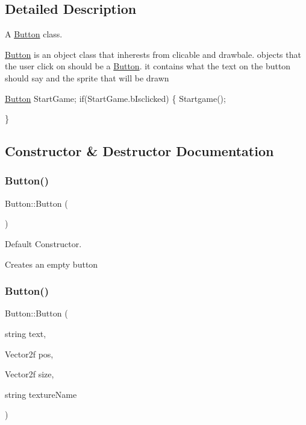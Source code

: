 \subsection{Detailed Description}
A \hyperlink{class_button}{Button} class.

\hyperlink{class_button}{Button} is an object class that inherests from clicable and drawbale. objects that the user click on should be a \hyperlink{class_button}{Button}. it contains what the text on the button should say and the sprite that will be drawn 
\begin{DoxyCode}
\hyperlink{class_button}{Button} StartGame;
\textcolor{keywordflow}{if}(StartGame.bIsclicked)
\{
Startgame();

\}
\end{DoxyCode}
 

\subsection{Constructor \& Destructor Documentation}
\hypertarget{class_button_a3b36df1ae23c58aedb9e15a713159459}{}\label{class_button_a3b36df1ae23c58aedb9e15a713159459} 
\subsubsection{\texorpdfstring{Button()}{Button()}\hspace{0.1cm}{\footnotesize\ttfamily [1/2]}}
{\footnotesize\ttfamily Button\+::\+Button (\begin{DoxyParamCaption}{ }\end{DoxyParamCaption})}



Default Constructor. 

Creates an empty button \hypertarget{class_button_ad33024be2e6d0cc53e4f11d70ed01c52}{}\label{class_button_ad33024be2e6d0cc53e4f11d70ed01c52} 
\subsubsection{\texorpdfstring{Button()}{Button()}\hspace{0.1cm}{\footnotesize\ttfamily [2/2]}}
{\footnotesize\ttfamily Button\+::\+Button (\begin{DoxyParamCaption}\item[{string}]{text,  }\item[{Vector2f}]{pos,  }\item[{Vector2f}]{size,  }\item[{string}]{texture\+Name }\end{DoxyParamCaption})}




